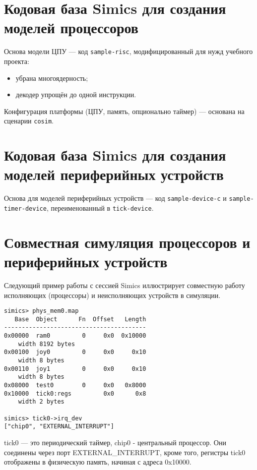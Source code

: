 \section[Кодовая база моделей процессоров]{Кодовая база Simics для создания моделей процессоров}

Основа модели ЦПУ --- код \texttt{sample-risc}, модифицированный для нужд учебного проекта:
\begin{itemize}
    \item убрана многоядерность;
    \item декодер упрощён до одной инструкции.
\end{itemize}

Конфигурация платформы (ЦПУ, память, опционально таймер) --- основана на сценарии \texttt{cosim}.

\section[Кодовая база моделей устройств]{Кодовая база Simics для создания моделей периферийных устройств}

Основа для моделей периферийных устройств --- код \texttt{sample-device-c} и \texttt{sample-timer-device}, переименованный в \texttt{tick-device}.

\section{Совместная симуляция процессоров и периферийных устройств}

Следующий пример работы с сессией Simics иллюстрирует совместную работу исполняющих (процессоры) и неисполняющих устройств в симуляции.

\begin{lstlisting}
simics> phys_mem0.map
   Base  Object      Fn  Offset   Length
----------------------------------------
0x00000  ram0         0     0x0  0x10000
    width 8192 bytes
0x00100  joy0         0     0x0     0x10
    width 8 bytes
0x00110  joy1         0     0x0     0x10
    width 8 bytes
0x08000  test0        0     0x0   0x8000
0x10000  tick0:regs         0x0      0x8
    width 2 bytes

simics> tick0->irq_dev
["chip0", "EXTERNAL_INTERRUPT"]
\end{lstlisting}

tick0 — это периодический таймер, chip0 - центральный процессор. Они соединены через порт EXTERNAL_INTERRUPT, кроме того, регистры tick0 отображены в физическую память, начиная с адреса 0x10000.

